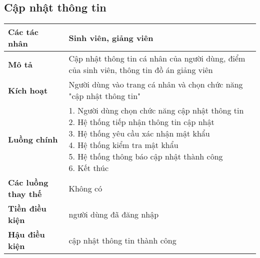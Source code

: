 \subsection*{Cập nhật thông tin}
	\begin{tabular}{|l|p{}|}
		\hline
		\textbf{Các tác nhân}         & Sinh viên, giảng viên                                                              \\
		\hline
		\textbf{Mô tả}                & Cập nhật thông tin cá nhân của người dùng, điểm của sinh viên, thông tin đồ án giảng viên \\
		\hline
		\textbf{Kích hoạt}            & Người dùng vào trang cá nhân và chọn chức năng "cập nhật thông tin"                       \\
		\hline
		\textbf{Luồng chính}           & \makecell[l]{1. Người dùng chọn chức năng cập nhật thông tin                              \\ 2. Hệ thống tiếp nhận thông tin cập nhật \\ 3. Hệ thống yêu cầu xác nhận mật khẩu \\ 4. Hệ thống kiểm tra mật khẩu \\ 5. Hệ thống thông báo cập nhật thành công \\ 6. Kết thúc} \\
		\hline
		\textbf{Các luồng thay thế}   & Không có                                                                                  \\
		\hline
		\textbf{Tiền điều kiện}       & người dùng đã đăng nhập                                                                   \\
		\hline
		\textbf{Hậu điều kiện}        & cập nhật thông tin thành công                                                             \\
		\hline
	\end{tabular}


